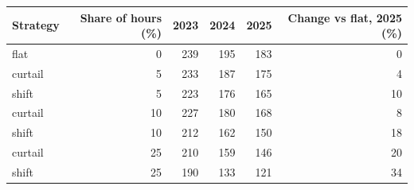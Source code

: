 \begin{tabular}{lrrrrr}
\toprule
Strategy & Share of hours (\%) & 2023 & 2024 & 2025 & Change vs flat, 2025 (\%) \\
\midrule
flat & 0 & 239 & 195 & 183 & 0 \\
curtail & 5 & 233 & 187 & 175 & 4 \\
shift & 5 & 223 & 176 & 165 & 10 \\
curtail & 10 & 227 & 180 & 168 & 8 \\
shift & 10 & 212 & 162 & 150 & 18 \\
curtail & 25 & 210 & 159 & 146 & 20 \\
shift & 25 & 190 & 133 & 121 & 34 \\
\bottomrule
\end{tabular}